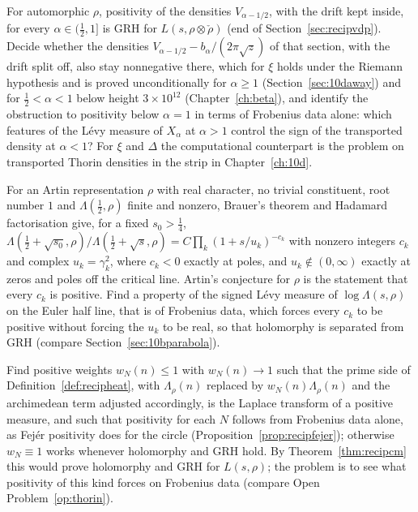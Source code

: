 \begin{problem}\label{op:recipdescent}
For automorphic $\rho$, positivity of the densities $V_{\alpha-1/2}$, with the drift kept inside, for every $\alpha\in(\frac12,1]$ is GRH for $L(s,\rho\otimes\check\rho)$ (end of Section~\ref{sec:recipvdp}). Decide whether the densities $V_{\alpha-1/2}-b_\alpha/(2\pi\sqrt z)$ of that section, with the drift split off, also stay nonnegative there, which for $\xi$ holds under the Riemann hypothesis and is proved unconditionally for $\alpha\ge1$ (Section~\ref{sec:10daway}) and for $\frac12<\alpha<1$ below height $3\times10^{12}$ (Chapter~\ref{ch:beta}), and identify the obstruction to positivity below $\alpha=1$ in terms of Frobenius data alone: which features of the L\'evy measure of $X_\alpha$ at $\alpha>1$ control the sign of the transported density at $\alpha<1$? For $\xi$ and $\Delta$ the computational counterpart is the problem on transported Thorin densities in the strip in Chapter~\ref{ch:10d}.
\end{problem}

\begin{problem}\label{op:recipsigned}
For an Artin representation $\rho$ with real character, no trivial constituent, root number $1$ and $\Lambda(\frac12,\rho)$ finite and nonzero, Brauer's theorem and Hadamard factorisation give, for a fixed $s_0>\frac14$, $\Lambda(\frac12+\sqrt{s_0},\rho)/\Lambda(\frac12+\sqrt s,\rho)=C\prod_k(1+s/u_k)^{-c_k}$ with nonzero integers $c_k$ and complex $u_k=\gamma_k^2$, where $c_k<0$ exactly at poles, and $u_k\notin(0,\infty)$ exactly at zeros and poles off the critical line. Artin's conjecture for $\rho$ is the statement that every $c_k$ is positive. Find a property of the signed L\'evy measure of $\log\Lambda(s,\rho)$ on the Euler half line, that is of Frobenius data, which forces every $c_k$ to be positive without forcing the $u_k$ to be real, so that holomorphy is separated from GRH (compare Section~\ref{sec:10bparabola}).
\end{problem}

\begin{problem}\label{op:recipfejer}
Find positive weights $w_N(n)\le1$ with $w_N(n)\to1$ such that the prime side of Definition~\ref{def:recipheat}, with $\Lambda_\rho(n)$ replaced by $w_N(n)\Lambda_\rho(n)$ and the archimedean term adjusted accordingly, is the Laplace transform of a positive measure, and such that positivity for each $N$ follows from Frobenius data alone, as Fej\'er positivity does for the circle (Proposition~\ref{prop:recipfejer}); otherwise $w_N\equiv1$ works whenever holomorphy and GRH hold. By Theorem~\ref{thm:recipcm} this would prove holomorphy and GRH for $L(s,\rho)$; the problem is to see what positivity of this kind forces on Frobenius data (compare Open Problem~\ref{op:thorin}).
\end{problem}

